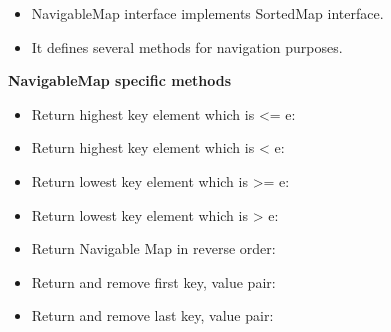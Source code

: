 \setlength{\columnsep}{3pt}
\begin{flushleft}
	
	\begin{itemize}
		\item NavigableMap interface implements SortedMap interface.
		\item It defines several methods for navigation purposes.	
	\end{itemize}
	
	\textbf{NavigableMap specific methods}
	
	\begin{itemize}
		\item Return highest key element which is <= e:
		\item Return highest key element which is < e:
		\item Return lowest key element which is >= e:
		\item Return lowest key element which is > e:
		\item Return Navigable Map in reverse order:
		\item Return and remove first key, value pair:
		\item Return and remove last key, value pair:
	\end{itemize}
	
\end{flushleft}
\newpage


